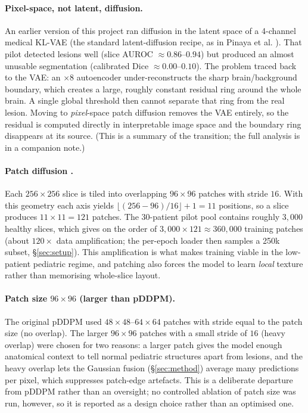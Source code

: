 \documentclass[12pt, a4paper]{article}
\theoremstyle{definition}\newtheorem{definition}{Definition}
\begin{document}
\paragraph{Pixel-space, not latent, diffusion.}
An earlier version of this project ran diffusion in the latent space of a
4-channel medical KL-VAE (the standard latent-diffusion recipe, as in Pinaya et al.
\cite{pinaya2022}). That pilot detected lesions well (slice AUROC $\approx0.86$--$0.94$)
but produced an almost unusable segmentation (calibrated Dice $\approx0.00$--$0.10$). The
problem traced back to the VAE: an $\times8$ autoencoder under-reconstructs the sharp
brain/background boundary, which creates a large, roughly constant residual ring around
the whole brain. A single global threshold then cannot separate that ring from the real
lesion. Moving to \emph{pixel}-space patch diffusion removes the VAE entirely, so the
residual is computed directly in interpretable image space and the boundary ring
disappears at its source. (This is a summary of the transition; the full analysis is in
a companion note.)

\paragraph{Patch diffusion \cite{behrendt2023}.}
Each $256{\times}256$ slice is tiled into overlapping $96{\times}96$ patches with stride
$16$. With this geometry each axis yields $\lfloor(256-96)/16\rfloor+1=11$ positions,
so a slice produces $11\times11=121$ patches. The 30-patient pilot pool contains roughly
$3{,}000$ healthy slices, which gives on the order of $3{,}000\times121\approx360{,}000$
training patches (about $120\times$ data amplification; the per-epoch loader then samples
a 250k subset, \S\ref{sec:setup}). This amplification is what makes training viable in
the low-patient pediatric regime, and patching also forces the model to learn
\emph{local} texture rather than memorising whole-slice layout.

\paragraph{Patch size $96{\times}96$ (larger than pDDPM).}
The original pDDPM \cite{behrendt2023} used $48{\times}48$--$64{\times}64$ patches with
stride equal to the patch size (no overlap). The larger $96{\times}96$ patches with
a small stride of $16$ (heavy overlap) were chosen for two reasons: a larger patch gives
the model enough anatomical context to tell normal pediatric structures apart from
lesions, and the heavy overlap lets the Gaussian fusion (\S\ref{sec:method}) average many
predictions per pixel, which suppresses patch-edge artefacts. This is a deliberate
departure from pDDPM rather than an oversight; no controlled ablation of patch size was
run, however, so it is reported as a design choice rather than an optimised one.
\end{document}
